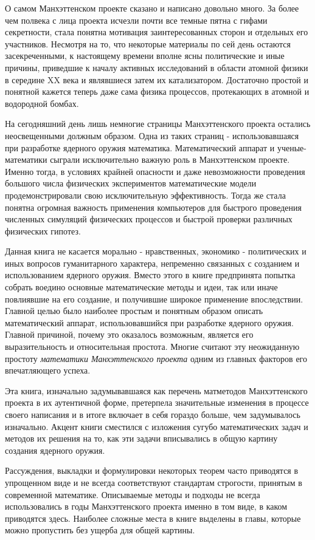 О самом Манхэттенском проекте сказано и написано довольно много.
За более чем полвека с лица проекта исчезли почти все темные пятна с гифами секретности, стала понятна мотивация заинтересованных сторон и отдельных его участников.
Несмотря на то, что некоторые материалы по сей день остаются засекреченными, к настоящему времени вполне ясны политические и иные причины, приведшие к началу активных исследований в области атомной физики в середине XX века и являвшиеся затем их катализатором.
Достаточно простой и понятной кажется теперь даже сама физика процессов, протекающих в атомной и водородной бомбах.

На сегодняшний день лишь немногие страницы Манхэттенского проекта остались неосвещенными должным образом. 
Одна из таких страниц - использовавшаяся при разработке ядерного оружия математика.
Математический аппарат и ученые-математики сыграли исключительно важную роль в Манхэттенском проекте.
Именно тогда, в условиях крайней опасности и даже невозможности проведения большого числа физических экспериментов математические модели продемонстрировали свою исключительную эффективность.
Тогда же стала понятна огромная важность применения компьютеров для быстрого проведения численных симуляций физических процессов и быстрой проверки различных физических гипотез.

Данная книга не касается морально - нравственных, экономико - политических и иных вопросов гуманитарного характера, непременно связанных с созданием и использованием ядерного оружия.
Вместо этого в книге предпринята попытка собрать воедино основные математические методы и идеи, так или иначе повлиявшие на его создание, и получившие широкое применение впоследствии.
Главной целью было наиболее простым и понятным образом описать математический аппарат, использовавшийся при разработке ядерного оружия. 
Главной причиной, почему это оказалось возможным, является его выразительность и относительная простота. 
Многие считают эту неожиданную простоту \textit{математики Манхэттенского проекта} одним из главных факторов его впечатляющего успеха.

Эта книга, изначально задумывавшаяся как перечень матметодов Манхэттенского проекта в их аутентичной форме, претерпела значительные изменения в процессе своего написания и в итоге включает в себя гораздо больше, чем задумывалось изначально.
Акцент книги сместился с изложения сугубо математических задач и методов их решения на то, как эти задачи вписывались в общую картину создания ядерного оружия.

Рассуждения, выкладки и формулировки некоторых теорем часто приводятся в упрощенном виде и не всегда соответствуют стандартам строгости, принятым в современной математике.
Описываемые методы и подходы не всегда использовались в годы Манхэттенского проекта именно в том виде, в каком приводятся здесь.
Наиболее сложные места в книге выделены в главы, которые можно пропустить без ущерба для общей картины.

